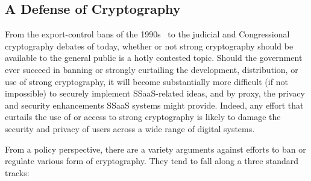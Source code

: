 \subsection{A Defense of Cryptography}

From the export-control bans of the 1990s~\cite{kehl2015} to the
judicial and Congressional cryptography debates of today, whether or
not strong cryptography should be available to the general public is a
hotly contested topic. Should the government ever succeed in banning
or strongly curtailing the development, distribution, or use of strong
cryptography, it will become substantially more difficult (if not
impossible) to securely implement SSaaS-related ideas, and by proxy,
the privacy and security enhancements SSaaS systems might
provide. Indeed, any effort that curtails the use of or access to
strong cryptography is likely to damage the security and privacy of
users across a wide range of digital systems.

From a policy perspective, there are a variety arguments against
efforts to ban or regulate various form of cryptography. They tend to
fall along a three standard tracks:


